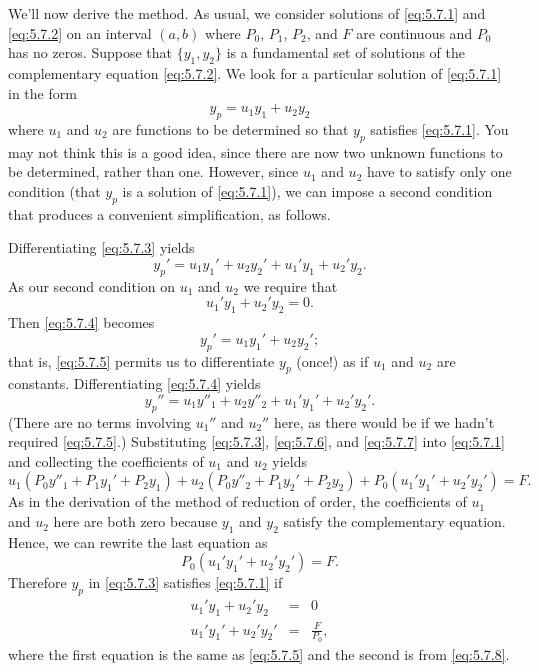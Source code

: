 \documentclass{ximera}
\begin{document}
We'll now derive the method. As usual, we consider solutions of
\eqref{eq:5.7.1} and \eqref{eq:5.7.2} on an interval $(a,b)$ where  $P_0$,
$P_1$, $P_2$, and $F$ are continuous and $P_0$ has no zeros. Suppose
that $\{y_1,y_2\}$ is a fundamental set of solutions of the
complementary equation \eqref{eq:5.7.2}. We look for
 a particular solution of \eqref{eq:5.7.1} in the form
\begin{equation} \label{eq:5.7.3}
y_p=u_1y_1+u_2y_2
\end{equation}
where $u_1$ and $u_2$ are functions to be determined so that $y_p$
satisfies \eqref{eq:5.7.1}. You may not think this is a good idea, since
there are now two unknown functions to be determined, rather than one.
However, since $u_1$ and $u_2$ have to satisfy only one condition
(that $y_p$ is a solution of \eqref{eq:5.7.1}), we can impose a second
condition that produces a convenient simplification, as follows.
 
 Differentiating \eqref{eq:5.7.3} yields
\begin{equation} \label{eq:5.7.4}
y_p'=u_1y_1'+u_2y_2'+u_1'y_1+u_2'y_2.
\end{equation}
As our second condition on $u_1$ and $u_2$
 we require that
\begin{equation} \label{eq:5.7.5}
u_1'y_1+u_2'y_2=0.
\end{equation}
 Then  \eqref{eq:5.7.4} becomes
\begin{equation}
y_p'=u_1y_1'+u_2y_2';     \label{eq:5.7.6}
\end{equation}
that is, \eqref{eq:5.7.5} permits us to differentiate $y_p$ (once!) as if
 $u_1$ and $u_2$ are constants. Differentiating
\eqref{eq:5.7.4} yields \begin{equation} \label{eq:5.7.7}
y_p''=u_1y''_1+u_2y''_2+u_1'y_1'+u_2'y_2'. \end{equation}
(There are no terms involving $u_1''$ and $u_2''$ here, as there would
be if we hadn't required \eqref{eq:5.7.5}.) Substituting \eqref{eq:5.7.3},
\eqref{eq:5.7.6}, and \eqref{eq:5.7.7} into \eqref{eq:5.7.1} and collecting the
coefficients of $u_1$ and $u_2$ yields
$$
u_1(P_0y''_1+P_1y_1'+P_2y_1)+u_2(P_0y''_2+P_1y_2'+P_2y_2)
+P_0(u_1'y_1'+u_2'y_2')=F.
$$
As in the derivation of the method of reduction of order, the
coefficients of $u_1$ and $u_2$ here are both zero because $y_1$ and
$y_2$ satisfy the complementary equation. Hence, we can rewrite the
last equation  as
\begin{equation}\label{eq:5.7.8}
  P_0(u_1'y_1'+u_2'y_2')=F.
\end{equation}
Therefore $y_p$ in \eqref{eq:5.7.3} satisfies \eqref{eq:5.7.1} if
\begin{equation} \label{eq:5.7.9}
\begin{array}{rcl}
u_1'y_1+u_2'y_2 &=& 0  \\
u_1'y_1'+u_2'y_2' &=& \frac{F}{P_0},
\end{array}
\end{equation}
where the first equation is the same as \eqref{eq:5.7.5} and the second is
from \eqref{eq:5.7.8}.
 
\end{document}
